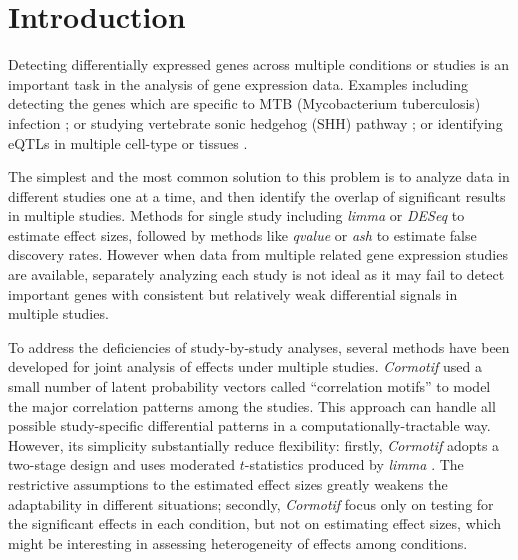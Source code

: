 \documentclass[12pt]{article}
\begin{document}
\newpage

\section{Introduction}

\vspace{4mm} Detecting differentially expressed genes across multiple conditions or studies is an important task in the analysis of gene expression data. Examples including detecting the genes which are specific to MTB (Mycobacterium tuberculosis) infection \cite{Blischak2015}; or studying vertebrate sonic hedgehog (SHH) pathway \cite{Wei2015}; or identifying eQTLs in multiple cell-type or tissues \cite{Urbut2017}. 

\vspace{4mm}\noindent The simplest and the most common solution to this problem is to analyze data in different studies one at a time, and then identify the overlap of significant results in multiple studies. Methods for single study including \emph{limma} \cite{Smyth} or \emph{DESeq} \cite{Anders2010} to estimate effect sizes, followed by
methods like \emph{qvalue} \cite{Storey2003} or \emph{ash} \cite{Stephens2017} to estimate false discovery rates. However when data from multiple related gene expression studies are available, separately analyzing each study is not ideal as it may fail to detect important genes with consistent but relatively weak differential signals in multiple studies. 

\vspace{4mm}\noindent To address the deficiencies of study-by-study analyses, several methods have been developed for joint analysis of effects under multiple studies. \emph{Cormotif} \cite{Wei2015} used a small number of latent probability vectors called ``correlation motifs'' to model the major correlation patterns among the studies. This approach can handle all possible study-specific differential patterns in a computationally-tractable way. However, its simplicity substantially reduce flexibility: firstly, \emph{Cormotif} adopts a two-stage design and uses moderated $t$-statistics produced by \emph{limma} \cite{Smyth}. The restrictive assumptions to the estimated effect sizes greatly weakens the adaptability in different situations; secondly, \emph{Cormotif} focus only on testing for the significant effects in each condition, but not on estimating effect sizes, which might be interesting in assessing heterogeneity of effects among conditions. 
\end{document}
